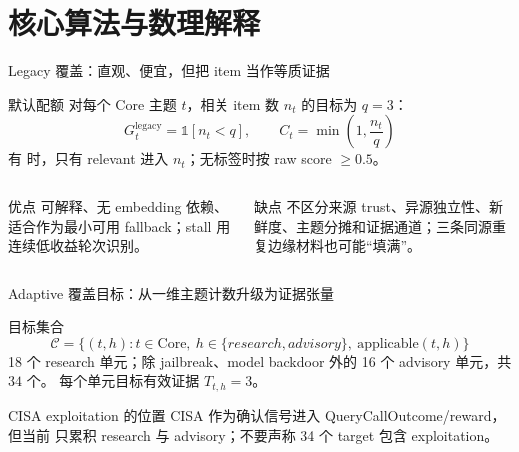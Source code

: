 \section{核心算法与数理解释}

\begin{frame}{Legacy 覆盖：直观、便宜，但把 item 当作等质证据}
\begin{block}{默认配额}
对每个 Core 主题 $t$，相关 item 数 $n_t$ 的目标为 $q=3$：
\[
G_t^{\mathrm{legacy}}=\mathbb{1}[n_t<q],\qquad
C_t=\min\left(1,\frac{n_t}{q}\right)
\]
有  时，只有 relevant 进入 $n_t$；无标签时按 raw score $\ge 0.5$。
\end{block}

\begin{columns}[T,onlytextwidth]
\begin{exampleblock}{优点}
可解释、无 embedding 依赖、适合作为最小可用 fallback；stall 用连续低收益轮次识别。
\end{exampleblock}
\begin{alertblock}{缺点}
不区分来源 trust、异源独立性、新鲜度、主题分摊和证据通道；三条同源重复边缘材料也可能“填满”。
\end{alertblock}
\end{columns}
\end{frame}

\begin{frame}{Adaptive 覆盖目标：从一维主题计数升级为证据张量}
\begin{block}{目标集合}
\[
\mathcal{C}=\{(t,h):t\in\text{Core},\ h\in\{research,advisory\},\ \text{applicable}(t,h)\}
\]
18 个 research 单元；除 jailbreak、model backdoor 外的 16 个 advisory 单元，共 $34$ 个。
每个单元目标有效证据 $T_{t,h}=3$。
\end{block}

\centering
{}

\vspace{0.5em}
\begin{alertblock}{CISA exploitation 的位置}
CISA 作为确认信号进入 QueryCallOutcome/reward，但当前  只累积 research 与 advisory；不要声称 34 个 target 包含 exploitation。
\end{alertblock}
\end{frame}

